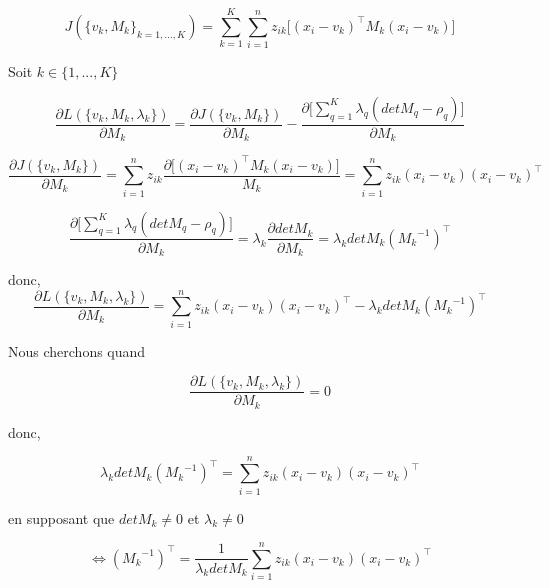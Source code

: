 \documentclass[a4paper,11pt,oneside,roman]{article}
\begin{document}
    \begin{equation}
        J(\{v_k, M_k\}_{k=1,...,K}) = \sum^{K}_{k=1}\sum^{n}_{i=1} z_{ik} \big[ (x_i-v_k)^\top M_k (x_i-v_k)\big]
    \end{equation}

    Soit $k\in \{1,...,K\}$

    \begin{equation}
        \frac{\partial L(\{v_k, M_k, \lambda_k\})}{\partial M_k} = \frac{\partial J(\{v_k, M_k\})}{\partial M_k} - \frac{\partial\big[ \sum^{K}_{q=1} \lambda_q (det M_q - \rho_q)\big]}{\partial M_k}
    \end{equation}

    \begin{equation}
        \frac{\partial J(\{v_k, M_k\})}{\partial M_k} = \sum^{n}_{i=1} z_{ik} \frac{\partial \big[(x_i-v_k)^\top M_k (x_i-v_k)\big]}{M_k} =  \sum^{n}_{i=1} z_{ik} (x_i-v_k)(x_i-v_k)^\top
    \end{equation}
    
    \begin{equation}
        \frac{\partial \big[\sum^{K}_{q=1} \lambda_q (det M_q - \rho_q)\big]}{\partial M_k} = \lambda_k \frac{\partial det M_k}{\partial M_k} = \lambda_k det M_k ({M_k}^{-1})^\top
    \end{equation}

    donc,
    \begin{equation}
        \frac{\partial L(\{v_k, M_k, \lambda_k\})}{\partial M_k} = \sum^{n}_{i=1} z_{ik} (x_i-v_k)(x_i-v_k)^\top - \lambda_k det M_k ({M_k}^{-1})^\top
    \end{equation}

    Nous cherchons quand 

    \begin{equation}
        \frac{\partial L(\{v_k, M_k, \lambda_k\})}{\partial M_k} = 0
    \end{equation}

    donc,

    \begin{equation}
        \lambda_k det M_k ({M_k}^{-1})^\top = \sum^{n}_{i=1} z_{ik} (x_i-v_k)(x_i-v_k)^\top
    \end{equation}

    en supposant que $det M_k \neq 0$ et $\lambda_k \neq 0$

    \begin{equation}
        \iff ({M_k}^{-1})^\top = \frac{1}{\lambda_k det M_k }\sum^{n}_{i=1} z_{ik} (x_i-v_k)(x_i-v_k)^\top
        \label{eq_8}
    \end{equation}
\end{document}
